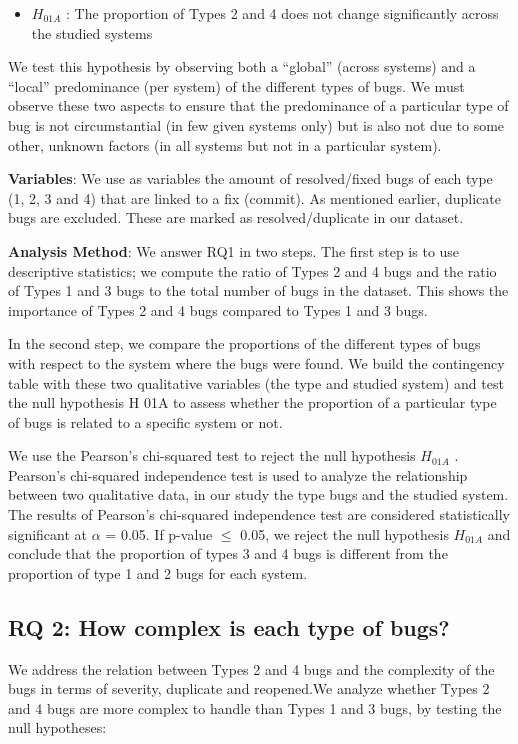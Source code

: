 \begin{itemize}
	\item $H_{01A}$ : The proportion of Types 2 and 4 does not
change significantly across the studied systems
\end{itemize}


We test this hypothesis by observing both a “global”
(across systems) and a “local” predominance (per system) of
the different types of bugs. We must observe these two
aspects to ensure that the predominance of a particular type of
bug is not circumstantial (in few given systems only) but is
also not due to some other, unknown factors (in all systems
but not in a particular system).

{\bf Variables}: We use as variables the amount of resolved/fixed
bugs of each type (1, 2, 3 and 4) that are linked to a fix
(commit). As mentioned earlier, duplicate bugs are excluded.
These are marked as resolved/duplicate in our dataset.

{\bf Analysis Method}: We answer RQ1 in two steps. The first
step is to use descriptive statistics; we compute the ratio of
Types 2 and 4 bugs and the ratio of Types 1 and 3 bugs to the
total number of bugs in the dataset. This shows the
importance of Types 2 and 4 bugs compared to Types 1 and 3
bugs.

In the second step, we compare the proportions of the
different types of bugs with respect to the system where the
bugs were found. We build the contingency table with these
two qualitative variables (the type and studied system) and
test the null hypothesis H 01A to assess whether the proportion
of a particular type of bugs is related to a specific system or
not.

We use the Pearson's chi-squared test to reject the null
hypothesis $H_{01A}$ . Pearson’s chi-squared independence test is
used to analyze the relationship between two qualitative data,
in our study the type bugs and the studied system. The results
of Pearson’s chi-squared independence test are considered
statistically significant at $\alpha$ = 0.05. If p-value $\le$ 0.05, we
reject the null hypothesis $H_{01A}$ and conclude that the
proportion of types 3 and 4 bugs is different from the
proportion of type 1 and 2 bugs for each system.

\subsection{RQ 2: How complex is each type of bugs?}

We address the relation between Types 2 and 4 bugs and
the complexity of the bugs in terms of severity, duplicate and
reopened.We analyze whether Types 2 and 4 bugs are more
complex to handle than Types 1 and 3 bugs, by testing the
null hypotheses:

